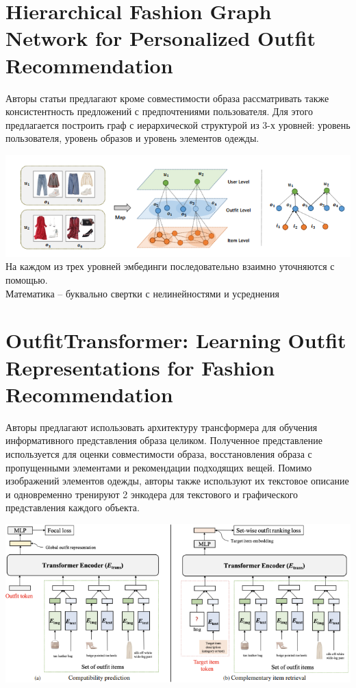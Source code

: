 \documentclass[a4paper,12pt]{article}
\begin{document}
\section{Hierarchical Fashion Graph Network for Personalized Outfit Recommendation}
Авторы статьи предлагают кроме совместимости образа рассматривать также консистентность предложений с предпочтениями пользователя. Для этого предлагается построить граф с иерархической структурой из 3-х уровней: уровень пользователя, уровень образов и уровень элементов одежды.

\includegraphics[scale = 0.97]{FashionGraphNet_intro.png}\\

На каждом из трех уровней эмбединги последовательно взаимно уточняются с помощью. \\
Математика -- буквально свертки с нелинейностями и усреднения 


\section{OutfitTransformer: Learning Outfit Representations for Fashion Recommendation
}
Авторы предлагают использовать архитектуру трансформера для обучения информативного представления образа целиком. Полученное представление используется для оценки совместимости образа, восстановления образа с пропущенными элементами и рекомендации подходящих вещей. Помимо изображений элементов одежды, авторы также используют их текстовое описание и одновременно тренируют 2 энкодера для текстового и графического представления каждого объекта.

\includegraphics[scale = 0.8]{OutfitTransfromer intro.png}\\
\end{document}
